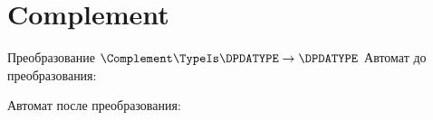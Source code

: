 \section{Complement}
\begin{frame}{Преобразование $\Complement\TypeIs\DPDATYPE\to\DPDATYPE$}
	Автомат до преобразования:

	Автомат после преобразования:

\end{frame}
